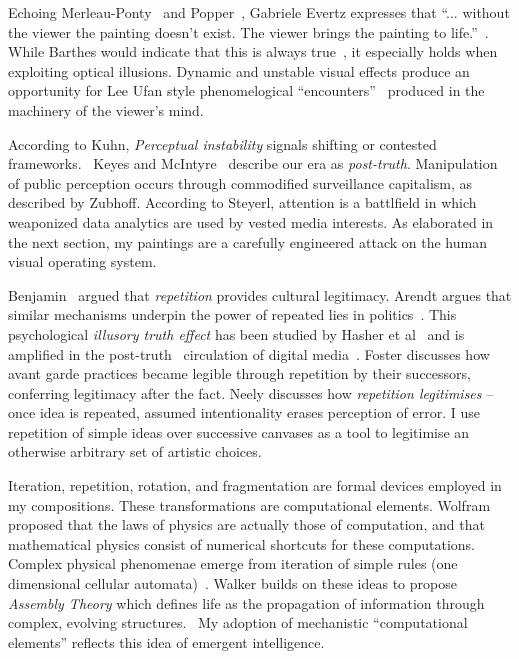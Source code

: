 \documentclass[12pt]{article}
\begin{document}
Echoing Merleau-Ponty~\cite{merleauPonty1962phenomenology} and
Popper~\cite{popper1972objective}, Gabriele Evertz expresses that
``... without the viewer the painting doesn't exist. The viewer brings
the painting to life.''~\cite{evertz09documentary}. While Barthes
would indicate that this is always true~\cite{barthes1977death}, it
especially holds when exploiting optical illusions. Dynamic and
unstable visual effects produce an opportunity for Lee Ufan style
phenomelogical ``encounters''~\cite[p. 52-6]{encounter} produced in
the machinery of the viewer's mind.

According to Kuhn, \emph{Perceptual instability} signals shifting or
contested frameworks.~\cite[p. 64]{kuhn1970structure}
Keyes\cite{keyes2004posttruth} and
McIntyre~\cite{mcintyre2018posttruth} describe our era as
\emph{post-truth}.  Manipulation of public perception occurs through
commodified surveillance capitalism, as described
by Zubhoff\cite{zuboff2019surveillance}. According to
Steyerl\cite{steyerl2016sea}, attention is a battlfield in which
weaponized data analytics are used by vested media interests. As
elaborated in the next section, my paintings are a carefully
engineered attack on the human visual operating system.

Benjamin~\cite{benjamin1935kunstwerk} argued that \emph{repetition}
provides cultural legitimacy. Arendt argues that similar mechanisms
underpin the power of repeated lies in
politics~\cite{arendt1972lying}. This psychological \emph{illusory
  truth effect} has been studied by Hasher et
al~\cite{hasher1977frequency} and is amplified in the
post-truth~\cite{keyes2004posttruth,mcintyre2018posttruth} circulation
of digital
media~\cite{zuboff2019surveillance}. Foster\cite[p. 29-30]{foster1996return}
discusses how avant garde practices became legible through repetition
by their successors, conferring legitimacy after the fact. Neely
discusses how \emph{repetition legitimises} -- once idea is repeated,
assumed intentionality erases perception of
error.\cite{neely-repetition} I use repetition of simple ideas over
successive canvases as a tool to legitimise an otherwise arbitrary set
of artistic choices.

Iteration, repetition, rotation, and fragmentation are formal devices
employed in my compositions. These transformations are computational
elements. Wolfram~\cite{wolfram1984} proposed that the laws of physics
are actually those of computation, and that mathematical physics
consist of numerical shortcuts for these computations. Complex
physical phenomenae emerge from iteration of simple rules
(one dimensional cellular automata)~\cite{wolfram}. 
Walker builds on these ideas to propose
\emph{Assembly Theory} which defines life as the propagation of
information through complex, evolving structures.~\cite{walker2024life} My adoption of
mechanistic ``computational elements'' reflects this idea of
emergent intelligence.
\end{document}

